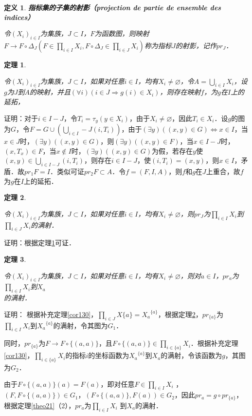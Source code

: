 \documentclass[12pt, a4paper, oneside]{book}
\newtheorem{theo}{定理}
\newtheorem{de}{定义}
\begin{document}
			\begin{de}
				\textbf{指标集的子集的射影（projection de partie de ensemble des indices）}
				\par
				令$(X_i)_{i\in I}$为集族，$J\subset I$，$F$为函数图，则映射$F\to F\circ \Delta_J(F\in \prod\limits_{i\in I}X_i , F\circ \Delta_J\in \prod\limits_{i\in J}X_i)$称为指标$J$的射影，记作$pr_J$．
			\end{de}
			
			\begin{theo}\label{theo41}
				\hfill\par
				令$(X_i)_{i\in I}$为集族，$J\subset I$，如果对任意$i\in I$，均有$X_i\neq \varnothing$，令$A=\bigcup\limits_{i\in I}X_i$，设$g$为$J$到$A$的映射，并且$(\forall i)(i\in J\Rightarrow g(i)\in X_i)$，则存在映射$f$，为$g$在$I$上的延拓，
			\end{theo}
			证明：对于$i\in I-J$，令$T_i=\tau_y(y\in X_i)$，由于$X_i\neq \varnothing$，因此$T_i\in X_i$．设$g$的图为$G$，令$F=G\cup(\bigcup\limits_{i\in I}-J(i, T_i))$，由于$(\exists y)((x, y)\in G)\Leftrightarrow x\in I$，当$x\in J$时，$(\exists y)((x, y)\in G)$，则$(\exists y)((x, y)\in F)$，当$x\in I-J$时，$(x, T_x)\in F$，当$x\notin I$时，$(\exists y)((x, y)\in G)$为假，若存在$y$使$(x, y)\in \bigcup\limits_{i\in I-J}(i, T_i)$，则存在$i\in I-J$，使$(i, T_i)=(x, y)$，则$x\in I$，矛盾．故$pr_1F=I$．类似可证$pr_2F\subset A$．令$f=(F, I, A)$，则$f$和$g$在$J$上重合，故$f$为$g$在$I$上的延拓．
						
			\begin{theo}\label{theo42}
				\hfill\par
				令$(X_i)_{i\in I}$为集族，$J\subset I$，如果对任意$i\in I$，均有$X_i\neq \varnothing$，则$pr_J$为$\prod\limits_{i\in I}X_i$到$\prod\limits_{i\in J}X_i$的满射．
			\end{theo}
			证明：根据定理\ref{theo41}可证．
			
			\begin{theo}\label{theo43}
				\hfill\par
				令$(X_i)_{i\in I}$为集族，$J\subset I$，如果对任意$i\in I$，均有$X_i\neq \varnothing$，则对$a\in I$，$pr_a$为$\prod\limits_{i\in I}X_i$到$X_a$\\的满射．
			\end{theo}
			证明：
			根据补充定理\ref{cor130}，$\prod\limits_{i\in J}X\{a\}={X_a}^{\{a\}}$，根据定理\ref{theo42}，$pr_{\{a\}}$为$\prod\limits_{i\in I}X_i $到${X_a}^{\{a\}}$的满射，令其图为$G_1$．
			\par
			同时，$pr_{\{a\}}$为$F\to F\circ \{(a, a)\}$，且$F\circ \{(a, a)\}\in \prod\limits_{i\in \{a\}}X_i$．根据补充定理\ref{cor130}，$\prod\limits_{i\in \{a\}}X_i$的指标$i$的坐标函数为${X_a}^{\{a\}}$到$X_a$的满射，令该函数为$g$，其图为$G_2$．
			\par
			由于$F\circ \{(a, a)\}(a)=F(a)$，即对任意$F\in \prod\limits_{i\in I}X_i$ ，$(F, F\circ \{(a, a)\})\in G_1$，$(F\circ \{(a, a)\}, F(a))\in G_2$，因此$pr_a=g\circ pr_{\{a\}}$，根据定理\ref{theo21}（2），$pr_a$为$\prod\limits_{i\in I}X_i$ 到$X_a$的满射．
						
\end{document}
